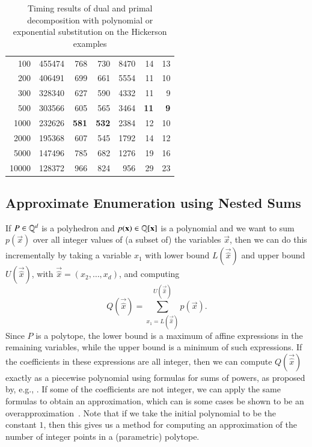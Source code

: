 \begin{table}
\begin{center}
\begin{tabular}{rrrrrrr}
\\
100 & 455474 & 768 & 730 & 8470 & 14 & 13
\\
200 & 406491 & 699 & 661 & 5554 & 11 & 10
\\
300 & 328340 & 627 & 590 & 4332 & 11 & 9
\\
500 & 303566 & 605 & 565 & 3464 & {\bf 11} & {\bf 9}
\\
1000 & 232626 & {\bf 581} & {\bf 532} & 2384 & 12 & 10
\\
2000 & 195368 & 607 & 545 & 1792 & 14 & 12
\\
5000 & 147496 & 785 & 682 & 1276 & 19 & 16
\\
10000 & 128372 & 966 & 824 & 956 & 29 & 23
\\
\hline
\end{tabular}
\caption{Timing results of dual and primal decomposition with
polynomial or exponential substitution on the Hickerson examples}
\label{t:hickerson}
\end{center}
\end{table}

\subsection{Approximate Enumeration using Nested Sums}
\label{s:nested}

If $P \in \mathbb{Q}^d$ is a polyhedron and $p(\vec x) \in \QQ[\vec x]$ is a
polynomial and we want to sum $p(\vec x)$ over all integer values
of (a subset of) the variables $\vec x$, then we can do this incrementally
by taking a variable $x_1$ with lower bound $L(\vec{\hat x})$
and upper bound $U(\vec{\hat x})$, with $\vec{\hat x} = (x_2, \ldots, x_d)$,
and computing
\begin{equation}
\label{eq:nested:sum}
Q(\vec{\hat x}) = \sum_{x_1 = L(\vec{\hat x})}^{U(\vec{\hat x})} p(\vec x)
.
\end{equation}
Since $P$ is a polytope, the lower bound is a maximum of affine expressions
in the remaining variables, while the upper bound is a minimum of such expressions.
If the coefficients in these expressions are all integer, then we can
compute $Q(\vec{\hat x})$ exactly as a piecewise polynomial using formulas
for sums of powers, as proposed by, e.g.,
.
If some of the coefficients are not integer, we can apply the same formulas
to obtain an approximation, which can is some cases be shown
to be an overapproximation~.
Note that if we take the initial polynomial to be the constant $1$, then
this gives us a method for computing an approximation of the number
of integer points in a (parametric) polytope.

